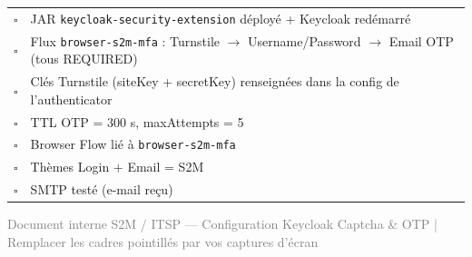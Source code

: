 \documentclass[10pt,a4paper]{article}
\begin{document}
\begin{tcolorbox}[colback=s2mlight,colframe=s2mblue,boxrule=0.5pt,title={\footnotesize\textbf{Checklist de mise en production}},left=3pt,right=3pt,top=1pt,bottom=1pt,arc=2pt]
{\footnotesize
\begin{tabular}{@{}p{0.45cm}p{15cm}@{}}
$\square$ & JAR \texttt{keycloak-security-extension} d\'eploy\'e + Keycloak red\'emarr\'e \\
$\square$ & Flux \texttt{browser-s2m-mfa} : Turnstile $\rightarrow$ Username/Password $\rightarrow$ Email OTP (tous REQUIRED) \\
$\square$ & Cl\'es Turnstile (siteKey + secretKey) renseign\'ees dans la config de l'authenticator \\
$\square$ & TTL OTP = 300 s, maxAttempts = 5 \\
$\square$ & Browser Flow li\'e \`a \texttt{browser-s2m-mfa} \\
$\square$ & Th\`emes Login + Email = S2M \\
$\square$ & SMTP test\'e (e-mail re\c{c}u) \\
\end{tabular}}
\end{tcolorbox}

\vspace{4pt}
\begin{center}
{\scriptsize\textcolor{gray}{Document interne S2M / ITSP --- Configuration Keycloak Captcha \& OTP \quad|\quad
Remplacer les cadres pointill\'es par vos captures d'\'ecran}}
\end{center}
\end{document}

